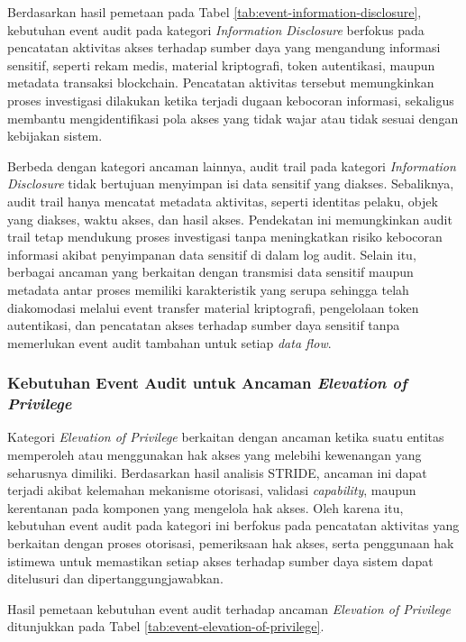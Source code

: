 Berdasarkan hasil pemetaan pada Tabel \ref{tab:event-information-disclosure}, kebutuhan event audit pada kategori \textit{Information Disclosure} berfokus pada pencatatan aktivitas akses terhadap sumber daya yang mengandung informasi sensitif, seperti rekam medis, material kriptografi, token autentikasi, maupun metadata transaksi blockchain. Pencatatan aktivitas tersebut memungkinkan proses investigasi dilakukan ketika terjadi dugaan kebocoran informasi, sekaligus membantu mengidentifikasi pola akses yang tidak wajar atau tidak sesuai dengan kebijakan sistem.

Berbeda dengan kategori ancaman lainnya, audit trail pada kategori \textit{Information Disclosure} tidak bertujuan menyimpan isi data sensitif yang diakses. Sebaliknya, audit trail hanya mencatat metadata aktivitas, seperti identitas pelaku, objek yang diakses, waktu akses, dan hasil akses. Pendekatan ini memungkinkan audit trail tetap mendukung proses investigasi tanpa meningkatkan risiko kebocoran informasi akibat penyimpanan data sensitif di dalam log audit. Selain itu, berbagai ancaman yang berkaitan dengan transmisi data sensitif maupun metadata antar proses memiliki karakteristik yang serupa sehingga telah diakomodasi melalui event transfer material kriptografi, pengelolaan token autentikasi, dan pencatatan akses terhadap sumber daya sensitif tanpa memerlukan event audit tambahan untuk setiap \textit{data flow}.

\subsubsection{Kebutuhan Event Audit untuk Ancaman \textit{Elevation of Privilege}}

Kategori \textit{Elevation of Privilege} berkaitan dengan ancaman ketika suatu entitas memperoleh atau menggunakan hak akses yang melebihi kewenangan yang seharusnya dimiliki. Berdasarkan hasil analisis STRIDE, ancaman ini dapat terjadi akibat kelemahan mekanisme otorisasi, validasi \textit{capability}, maupun kerentanan pada komponen yang mengelola hak akses. Oleh karena itu, kebutuhan event audit pada kategori ini berfokus pada pencatatan aktivitas yang berkaitan dengan proses otorisasi, pemeriksaan hak akses, serta penggunaan hak istimewa untuk memastikan setiap akses terhadap sumber daya sistem dapat ditelusuri dan dipertanggungjawabkan.

Hasil pemetaan kebutuhan event audit terhadap ancaman \textit{Elevation of Privilege} ditunjukkan pada Tabel \ref{tab:event-elevation-of-privilege}.

